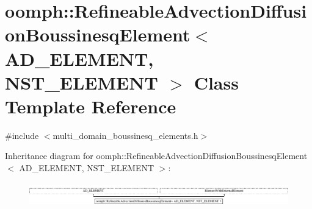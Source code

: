 \hypertarget{classoomph_1_1RefineableAdvectionDiffusionBoussinesqElement}{}\section{oomph\+:\+:Refineable\+Advection\+Diffusion\+Boussinesq\+Element$<$ A\+D\+\_\+\+E\+L\+E\+M\+E\+NT, N\+S\+T\+\_\+\+E\+L\+E\+M\+E\+NT $>$ Class Template Reference}
\label{classoomph_1_1RefineableAdvectionDiffusionBoussinesqElement}


{\ttfamily \#include $<$multi\+\_\+domain\+\_\+boussinesq\+\_\+elements.\+h$>$}

Inheritance diagram for oomph\+:\+:Refineable\+Advection\+Diffusion\+Boussinesq\+Element$<$ A\+D\+\_\+\+E\+L\+E\+M\+E\+NT, N\+S\+T\+\_\+\+E\+L\+E\+M\+E\+NT $>$\+:\begin{figure}[H]
\begin{center}
\leavevmode
\includegraphics[height=1.033210cm]{classoomph_1_1RefineableAdvectionDiffusionBoussinesqElement}
\end{center}
\end{figure}
